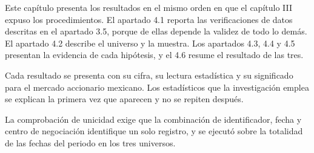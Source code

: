
Este capítulo presenta los resultados en el mismo orden en que el capítulo III expuso los procedimientos. El apartado 4.1 reporta las verificaciones de datos descritas en el apartado 3.5, porque de ellas depende la validez de todo lo demás. El apartado 4.2 describe el universo y la muestra. Los apartados 4.3, 4.4 y 4.5 presentan la evidencia de cada hipótesis, y el 4.6 resume el resultado de las tres.

Cada resultado se presenta con su cifra, su lectura estadística y su significado para el mercado accionario mexicano. Los estadísticos que la investigación emplea se explican la primera vez que aparecen y no se repiten después.



La comprobación de unicidad exige que la combinación de identificador, fecha y centro de negociación identifique un solo registro, y se ejecutó sobre la totalidad de las fechas del periodo en los tres universos.



